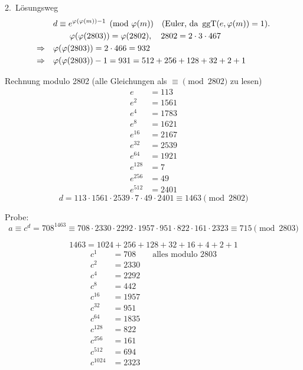 \begin{loesung}
\begin{enumerate}[label=\alph*)]
  2.\ Lösungsweg
  \begin{align*}
  & d \equiv e^{\varphi(\varphi(m)) - 1} \pmod{\varphi(m)} \quad (\text{Euler, da } \operatorname{ggT}(e, \varphi(m)) = 1).\\
  & \qquad \varphi(\varphi(2803)) = \varphi(2802), \quad 2802 = 2 \cdot 3 \cdot 467\\
  \Rightarrow\quad & \varphi(\varphi(2803)) = 2 \cdot 466 = 932\\
  \Rightarrow\quad & \varphi(\varphi(2803)) - 1 = 931 = 512 + 256 + 128 + 32 + 2 + 1
  \end{align*}
\end{enumerate}

Rechnung modulo 2802 (alle Gleichungen als $\equiv \pmod{2802}$ zu lesen)
\begin{align*}
e &= 113\\
e^2 &= 1561\\
e^4 &= 1783\\
e^8 &= 1621\\
e^{16} &= 2167\\
e^{32} &= 2539\\
e^{64} &= 1921\\
e^{128} &= 7\\
e^{256} &= 49\\
e^{512} &= 2401
\end{align*}
\[
d = 113 \cdot 1561 \cdot 2539 \cdot 7 \cdot 49 \cdot 2401 \equiv 1463 \pmod{2802}
\]

\medskip
Probe:
\[
a \equiv c^d = 708^{1463} \equiv 708 \cdot 2330 \cdot 2292 \cdot 1957 \cdot 951 \cdot 822 \cdot 161 \cdot 2323 \equiv 715 \pmod{2803}
\]

\[
1463 = 1024 + 256 + 128 + 32 + 16 + 4 + 2 + 1
\]
\begin{align*}
c^1 &= 708 \qquad \text{alles modulo } 2803\\
c^2 &= 2330\\
c^4 &= 2292\\
c^8 &= 442\\
c^{16} &= 1957\\
c^{32} &= 951\\
c^{64} &= 1835\\
c^{128} &= 822\\
c^{256} &= 161\\
c^{512} &= 694\\
c^{1024} &= 2323
\end{align*}
\end{loesung}
